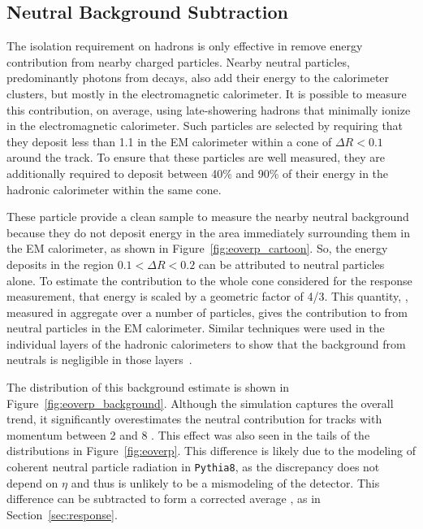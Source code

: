 \subsection{Neutral Background Subtraction}
\label{sec:neutral_bg}

The isolation requirement on hadrons is only effective in remove energy contribution from nearby charged particles. 
Nearby neutral particles, predominantly photons from \piz decays, also add their energy to the calorimeter clusters, but mostly in the electromagnetic calorimeter. 
It is possible to measure this contribution, on average, using late-showering hadrons that minimally ionize in the electromagnetic calorimeter. 
Such particles are selected by requiring that they deposit less than 1.1 \GeV in the EM calorimeter within a cone of $\Delta R < 0.1$ around the track. 
To ensure that these particles are well measured, they are additionally required to deposit between 40\% and 90\% of their energy in the hadronic calorimeter within the same cone. 

These particle provide a clean sample to measure the nearby neutral background because they do not deposit energy in the area immediately surrounding them in the EM calorimeter, as shown in Figure~\ref{fig:eoverp_cartoon}.
So, the energy deposits in the region $0.1 < \Delta R < 0.2$ can be attributed to neutral particles alone.
To estimate the contribution to the whole cone considered for the response measurement, that energy is scaled by a geometric factor of 4/3. 
This quantity, \epbg, measured in aggregate over a number of particles, gives the contribution to \epav from neutral particles in the EM calorimeter. 
Similar techniques were used in the individual layers of the hadronic calorimeters to show that the background from neutrals is negligible in those layers~\cite{PERF-2011-05}. 

The distribution of this background estimate is shown in Figure~\ref{fig:eoverp_background}. 
Although the simulation captures the overall trend, it significantly overestimates the neutral contribution for tracks with momentum between 2 and 8 \GeV.
This effect was also seen in the tails of the \ep distributions in Figure~\ref{fig:eoverp}.
This difference is likely due to the modeling of coherent neutral particle radiation in \texttt{Pythia8}, as the discrepancy does not depend on $\eta$ and thus is unlikely to be a mismodeling of the detector.
This difference can be subtracted to form a corrected average \ep, as in Section~\ref{sec:response}.

